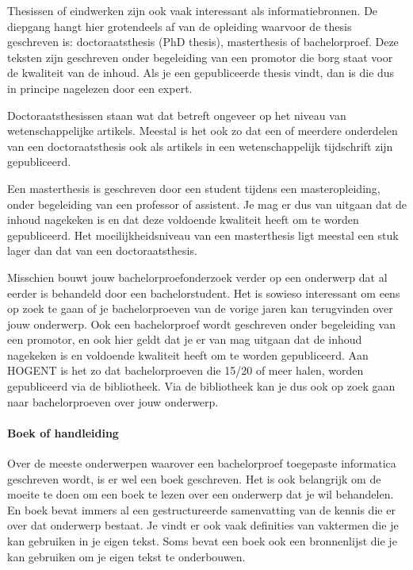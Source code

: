 Thesissen of eindwerken zijn ook vaak interessant als informatiebronnen. De diepgang hangt hier grotendeels af van de opleiding waarvoor de thesis geschreven is: doctoraatsthesis (PhD thesis), masterthesis of bachelorproef. Deze teksten zijn geschreven onder begeleiding van een promotor die borg staat voor de kwaliteit van de inhoud. Als je een gepubliceerde thesis vindt, dan is die dus in principe nagelezen door een expert.

Doctoraatsthesissen staan wat dat betreft ongeveer op het niveau van wetenschappelijke artikels. Meestal is het ook zo dat een of meerdere onderdelen van een doctoraatsthesis ook als artikels in een wetenschappelijk tijdschrift zijn gepubliceerd.

Een masterthesis is geschreven door een student tijdens een masteropleiding, onder begeleiding van een professor of assistent. Je mag er dus van uitgaan dat de inhoud nagekeken is en dat deze voldoende kwaliteit heeft om te worden gepubliceerd. Het moeilijkheidsniveau van een masterthesis ligt meestal een stuk lager dan dat van een doctoraatsthesis.

Misschien bouwt jouw bachelorproefonderzoek verder op een onderwerp dat al eerder is behandeld door een bachelorstudent. Het is sowieso interessant om eens op zoek te gaan of je bachelorproeven van de vorige jaren kan terugvinden over jouw onderwerp. Ook een bachelorproef wordt geschreven onder begeleiding van een promotor, en ook hier geldt dat je er van mag uitgaan dat de inhoud nagekeken is en voldoende kwaliteit heeft om te worden gepubliceerd. Aan HOGENT is het zo dat bachelorproeven die 15/20 of meer halen, worden gepubliceerd via de bibliotheek. Via de bibliotheek kan je dus ook op zoek gaan naar bachelorproeven over jouw onderwerp.

\paragraph{Boek of handleiding}

Over de meeste onderwerpen waarover een bachelorproef toegepaste informatica geschreven wordt, is er wel een boek geschreven. Het is ook belangrijk om de moeite te doen om een boek te lezen over een onderwerp dat je wil behandelen. En boek bevat immers al een gestructureerde samenvatting van de kennis die er over dat onderwerp bestaat. Je vindt er ook vaak definities van vaktermen die je kan gebruiken in je eigen tekst. Soms bevat een boek ook een bronnenlijst die je kan gebruiken om je eigen tekst te onderbouwen.

